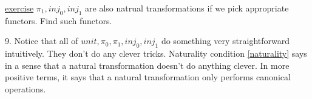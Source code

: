 \documentclass{report}[12pt]
\begin{document}
\begin{definition}
\underline{exercise} $\pi_1, inj_0, inj_1$ are also natrual transformations if we pick appropriate functors. Find such functors.

9. Notice that all of $unit, \pi_0, \pi_1, inj_0, inj_1$ do something very straightforward intuitively. They don't do any clever tricks. Naturality condition \ref{naturality} says in a sense that a natural transformation doesn't do anything clever. In more positive terms, it says that a natural transformation only performs canonical operations.
\end{definition}
\end{document}
